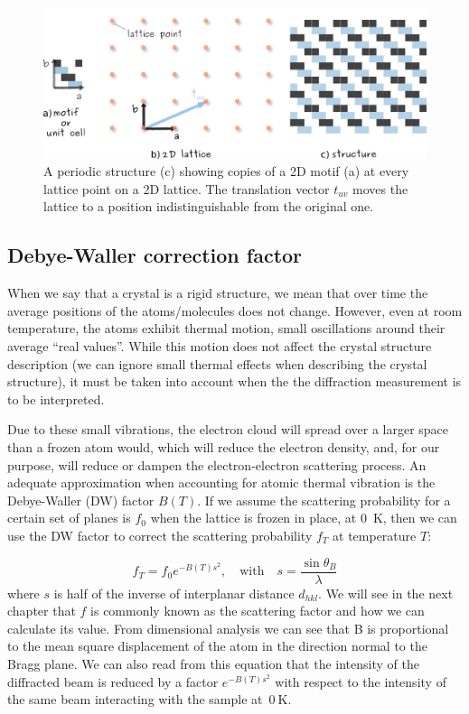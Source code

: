 \begin{figure}[ht]
    \centering
\includegraphics[width=0.9\linewidth]{Figures/motif.png}
\caption[2D crystal lattice definition.]{A periodic structure (c) showing copies of a 2D motif (a) at every lattice point on a 2D lattice. The translation vector $t_{uv}$ moves the lattice to a position indistinguishable from the original one.}
\label{Fig:motif}
\end{figure}




\subsection{Debye-Waller correction factor}
\label{Sec:DWf}

When we say that a crystal is a rigid structure, we mean that over time the average positions of the atoms/molecules does not change. However, even at room temperature, the atoms exhibit thermal motion, small oscillations around their average ``real values''. While this motion does not affect the crystal structure description (\ie we can ignore small thermal effects when describing the crystal structure), it must be taken into account when the the diffraction measurement is to be interpreted.

Due to these small vibrations, the electron cloud will spread over a larger space than a frozen atom would, which will reduce the electron density, and, for our purpose, will reduce or dampen the electron-electron scattering process. An adequate approximation when accounting for atomic thermal vibration is the Debye-Waller (DW) factor $B(T)$. If we assume the scattering probability for a certain set of planes is $f_0$ when the lattice is frozen in place, \ie at \SI{0}{\kelvin}, then we can use the DW factor to correct the scattering probability $f_T$ at temperature $T$:

\begin{equation}
\label{eq:correctedScattter}
f_T=f_0 e^{-B(T)s^2}, \quad \text{with}\quad s=\frac{\sin\theta_B}{\lambda}
\end{equation}
where $s$ is half of the inverse of interplanar distance $d_{hkl}$. We will see in the next chapter that $f$ is commonly known as the scattering factor and how we can calculate its value. From dimensional analysis we can see that B is proportional to the mean square displacement of the atom in the direction normal to the Bragg plane. We can also read from this equation that the intensity of the diffracted beam is reduced by a factor $e^{-B(T)s^2}$ with respect to the intensity of the same beam interacting with the sample at~$\SI{0}{\kelvin}$.

